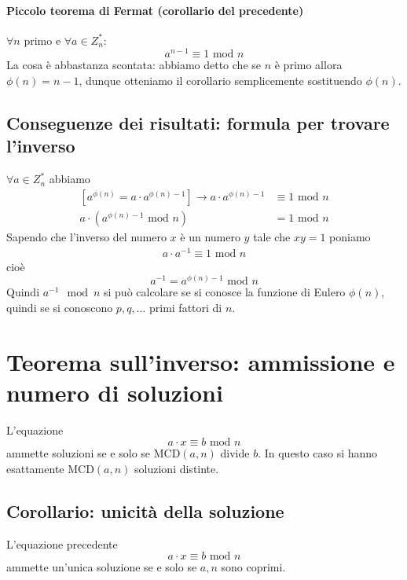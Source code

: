 \paragraph{Piccolo teorema di Fermat (corollario del precedente)}
$\forall n$ primo e $\forall a \in Z_{n}^*$:
$$ a^{n-1} \equiv 1 \text{ mod } n $$
La cosa è abbastanza scontata: abbiamo detto che se $n$ è primo allora $\phi(n)=n-1$, dunque otteniamo il corollario semplicemente sostituendo $\phi(n)$.

\subsection{Conseguenze dei risultati: formula per trovare l'inverso}
$\forall a \in Z_{n}^*$ abbiamo
\begin{align*}
	\left[a^{\phi(n)}=a \cdot a^{\phi(n)-1} \right] \longrightarrow a \cdot a^{\phi(n)-1} &\equiv 1 \text{ mod } n\\
	a \cdot \left(a^{\phi(n)-1} \text{ mod } n\right) &= 1 \text{ mod } n
\end{align*}
Sapendo che l'inverso del numero $x$ è un numero $y$ tale che $xy=1$ poniamo
\begin{align*}
	a \cdot a^{-1} \equiv 1 \text{ mod } n
\end{align*}
cioè
$$\boxed{a^{-1} = a^{\phi(n)-1} \text{ mod } n} $$
Quindi $a^{-1} \mod n$ si può calcolare se si conosce la funzione di Eulero $\phi(n)$, quindi se si conoscono $p, q, \dots$ primi fattori di $n$. 

\section{Teorema sull'inverso: ammissione e numero di soluzioni}
L'equazione $$a \cdot x \equiv b \text{ mod } n$$ ammette soluzioni se e solo se $\text{MCD}(a,n)$ divide $b$.
In questo caso si hanno esattamente $\text{MCD}(a,n)$ soluzioni distinte.

\subsection{Corollario: unicità della soluzione} L'equazione precedente
$$a \cdot x \equiv b \text{ mod } n$$ ammette un'unica soluzione se e solo se $a,n$ sono coprimi.  

